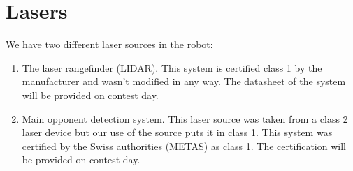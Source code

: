 \documentclass[a4paper]{paper}
\begin{document}
\section{Lasers}
We have two different laser sources in the robot:
\begin{enumerate}
    \item The laser rangefinder (LIDAR).
        This system is certified class 1 by the manufacturer and wasn't modified in any way.
        The datasheet of the system will be provided on contest day.
    \item Main opponent detection system.
        This laser source was taken from a class 2 laser device but our use of the source puts it in class 1.
        This system was certified by the Swiss authorities (METAS) as class 1.
        The certification will be provided on contest day.
\end{enumerate}
\end{document}
